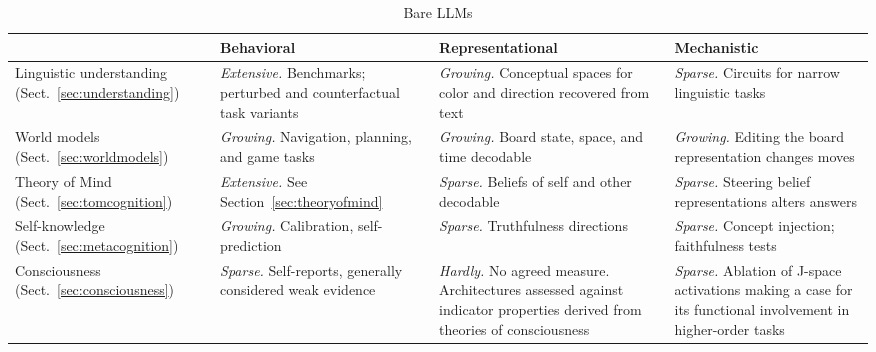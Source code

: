 \begin{table}
\tiny
\begin{subtable}{\textwidth}
\begin{tabularx}{\linewidth}{@{}p{2.1cm}XXX@{}}
\toprule
 & \textbf{Behavioral} & \textbf{Representational} & \textbf{Mechanistic} \\
\midrule
Linguistic understanding (Sect.~\ref{sec:understanding}) &
\emph{Extensive.} Benchmarks; perturbed and counterfactual task variants \citep{wu2024reasoning} &
\emph{Growing.} Conceptual spaces for color and direction recovered from text \citep{abdou2021language, patel2022mapping} &
\emph{Sparse.} Circuits for narrow linguistic tasks \citep{wang2022interpretability} \\
\addlinespace
World models (Sect.~\ref{sec:worldmodels}) &
\emph{Growing.} Navigation, planning, and game tasks \citep{momennejad2023cogeval, paglieri2024balrog} &
\emph{Growing.} Board state, space, and time decodable \citep{li2023emergent, gurnee2024language} &
\emph{Growing.} Editing the board representation changes moves \citep{li2023emergent, nanda2023emergent} \\
\addlinespace
Theory of Mind (Sect.~\ref{sec:tomcognition}) &
\emph{Extensive.} See Section~\ref{sec:theoryofmind} &
\emph{Sparse.} Beliefs of self and other decodable \citep{zhu2024language, bortoletto2024benchmarking} &
\emph{Sparse.} Steering belief representations alters answers \citep{zhu2024language} \\
\addlinespace
Self-knowledge (Sect.~\ref{sec:metacognition}) &
\emph{Growing.} Calibration, self-prediction \citep{kadavath2022language, binder2024looking} &
\emph{Sparse.} Truthfulness directions \citep{azaria2023internal, burns2023discovering} &
\emph{Sparse.} Concept injection; faithfulness tests \citep{lindsey2025introspection, turpin2023language} \\
\addlinespace
Consciousness (Sect.~\ref{sec:consciousness}) &
\emph{Sparse.} Self-reports, generally considered weak evidence \citep{perez2023towards} &
\emph{Hardly.} No agreed measure. Architectures assessed against indicator properties derived from theories of consciousness \citep{butlin2023consciousness} &
\emph{Sparse.} Ablation of J-space activations making a case for its functional involvement in higher-order tasks \citep{gurnee2026verbalize}\\
\bottomrule
\end{tabularx}
\caption{Bare LLMs}\label{tab:levels-bare}
\end{subtable}


\end{table}
